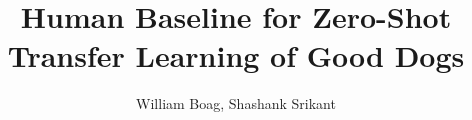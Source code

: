 \documentclass[sigplan,10pt]{acmart}
\begin{document}
\title[Good Dog Human Baselines]{Human Baseline for Zero-Shot Transfer Learning of Good Dogs}         %



\author{William Boag, Shashank Srikant}
\end{document}
